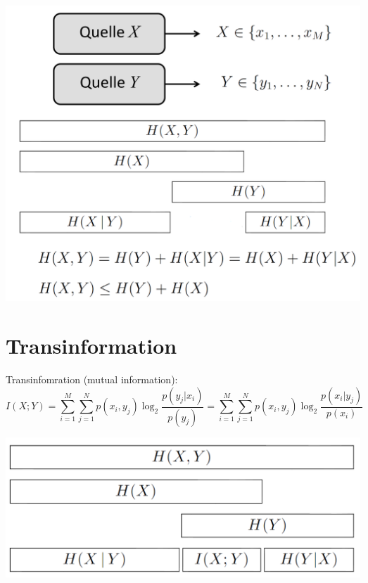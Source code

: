 \begin{center}
	\includegraphics[width=.9\textwidth]{../fig/verbundentro.png}
\end{center}

\section{Transinformation}
Transinfomration (mutual information):
\[ I(X;Y) = \sum_{i=1}^{M}\sum_{j=1}^{N}p(x_i,y_j)\log_2\frac{p(y_j|x_i)}{p(y_j)}
	= \sum_{i=1}^{M}\sum_{j=1}^{N}p(x_i,y_j)\log_2\frac{p(x_i|y_j)}{p(x_i)} \]
	
\begin{center}
	\includegraphics[width=.9\textwidth]{../fig/transinfo.png}
\end{center}

